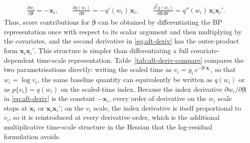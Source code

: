 \documentclass[5p,lefttitle]{elsarticle}
\begin{document}
{{\begin{align}
\frac{\partial w_i}{\partial\boldsymbol{\beta}}
=
-\boldsymbol{x}_i,
\qquad
\frac{\partial q(w_i)}{\partial\boldsymbol{\beta}}
=
-q'(w_i)\,\boldsymbol{x}_i,
\qquad
\frac{\partial^2 q(w_i)}{\partial\boldsymbol{\beta}\partial\boldsymbol{\beta}'}
=
q''(w_i)\,\boldsymbol{x}_i\boldsymbol{x}_i'.
\label{eq:aft-deriv}
\end{align}\normalsize}
Thus, score contributions for \(\boldsymbol{\beta}\) can be obtained by
differentiating the BP representation once with respect to its scalar
argument and then multiplying by the covariates, and the second
derivative in \eqref{eq:aft-deriv} has the outer-product form
\(\boldsymbol{x}_i\boldsymbol{x}_i'\). This structure is simpler than
differentiating a full covariate-dependent time-scale representation.
Table~\ref{tab:aft-deriv-compare} compares the two parametrisations
directly: writing the scaled time as
\(v_i=y_i\,e^{-\boldsymbol{\beta}'\boldsymbol{x}_i}\),
so that \(w_i=\log v_i\), the same baseline quantity
can equivalently be written as \(q(w_i)\) or as
\(p\{v_i\}=q(w_i)\) on the scaled-time index. Because
the index derivative \(\partial w_i/\partial\boldsymbol{\beta}\) in
\eqref{eq:aft-deriv} is the constant \(-\boldsymbol{x}_i\), every order of
derivative on the \(w_i\) scale stops at \(\boldsymbol{x}_i\) or
\(\boldsymbol{x}_i\boldsymbol{x}_i'\); on the \(v_i\)
scale, the index derivative is itself proportional to
\(v_i\), so it is reintroduced at every derivative
order, which is the additional multiplicative time-scale structure in
the Hessian that the log-residual formulation avoids.

}
\end{document}
